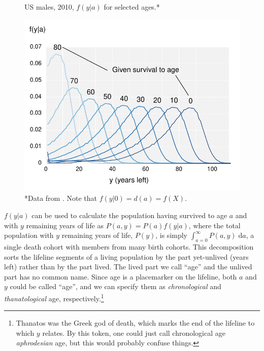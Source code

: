 \documentclass{article}
\newcommand{\dd}{\; \mathrm{d}}
\begin{document}
\begin{figure}[h]
\centering
	\caption{US males, 2010, $f(y|a)$ for selected ages.*}
	\label{fig:fya}
	\includegraphics[scale=.8]{Figures/fya.pdf}	
	\caption*{*Data from . Note that $f(y|0) = d(a) = f(X)$.}
\end{figure}
$f(y|a)$ can be used to calculate the population having survived to age $a$ and
with $y$ remaining years of life as $P(a,y) = P(a)f(y|a)$, where the total
population with $y$ remaining years of life, $P(y)$, is simply $\int
_{a=0}^\infty P(a,y) \dd a$, a single death cohort with members from many birth
cohorts. This decomposition sorts the lifeline segments of a living population
by the part yet-unlived (years left) rather than by the part lived. The lived
part we call ``age'' and the unlived part has no common name. Since age is a
placemarker on the lifeline, both $a$ and $y$ could be called ``age'', and we
can specify them as \textit{chronological} and \textit{thanatological} age,
respectively.\footnote{Thanatos was the Greek god of death, which marks the end of the lifeline to which $y$ relates. By this token, one could just call chronological age \textit{aphrodesian} age, but this would probably confuse things.}
\end{document}
